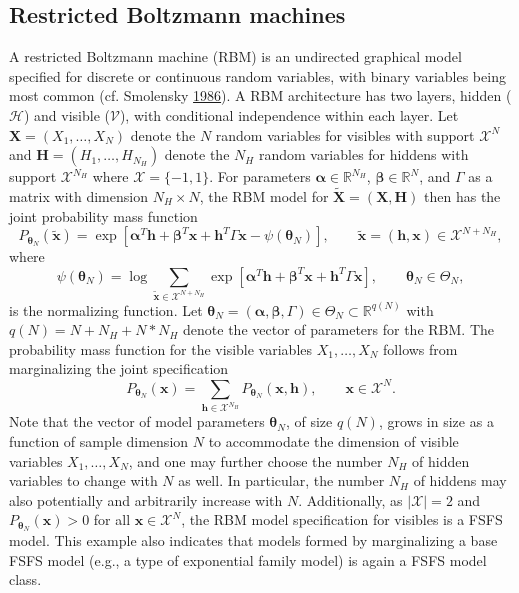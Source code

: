 \documentclass[12pt]{article}
\theoremstyle{definition}
\begin{document}
\subsection{Restricted Boltzmann
machines}\label{restricted-boltzmann-machines}

A restricted Boltzmann machine (RBM) is an undirected graphical model
specified for discrete or continuous random variables, with binary
variables being most common (cf. Smolensky
\protect\hyperlink{ref-smolensky1986information}{1986}). A RBM
architecture has two layers, hidden (\(\mathcal{H}\)) and visible
(\(\mathcal{V}\)), with conditional independence within each layer. Let
\(\boldsymbol X=(X_1,\ldots,X_N)\) denote the \(N\) random variables for
visibles with support \(\mathcal{X}^N\) and
\(\boldsymbol H=(H_1,\ldots,H_{N_H})\) denote the \(N_H\) random
variables for hiddens with support \(\mathcal{X}^{N_H}\) where
\(\mathcal{X} = \{-1,1\}\). For parameters
\(\boldsymbol \alpha \in \mathbb{R}^{N_H}\),
\(\boldsymbol \beta \in \mathbb{R}^N\), and \(\Gamma\) as a matrix with
dimension \(N_H \times N\), the RBM model for
\(\tilde{\boldsymbol X}=(\boldsymbol X,\boldsymbol H)\) then has the
joint probability mass function \[
P_{\boldsymbol \theta_N} (\tilde{\boldsymbol x}) = \exp\left[ \boldsymbol \alpha^T \boldsymbol h + \boldsymbol \beta^T \boldsymbol x + \boldsymbol h^T \Gamma \boldsymbol x - \psi(\boldsymbol \theta_N)\right], \qquad \tilde{\boldsymbol x} = (\boldsymbol h, \boldsymbol x) \in \mathcal{X}^{N+N_H},
\] where \[
\psi(\boldsymbol \theta_N) = \log \sum_{\tilde{\boldsymbol x} \in \mathcal{X}^{N + N_H}} \exp\left[ \boldsymbol \alpha^T \boldsymbol h + \boldsymbol \beta^T \boldsymbol x + \boldsymbol h^T \Gamma \boldsymbol x\right], \qquad \boldsymbol \theta_N \in \Theta_N,
\] is the normalizing function. Let
\(\boldsymbol \theta_N = (\boldsymbol \alpha, \boldsymbol \beta,\Gamma) \in \Theta_N \subset \mathbb{R}^{q(N)}\)
with \(q(N) = N + N_H + N*N_H\) denote the vector of parameters for the
RBM. The probability mass function for the visible variables
\(X_1, \dots, X_N\) follows from marginalizing the joint specification
\[
P_{\boldsymbol \theta_N} (\boldsymbol x) = \sum\limits_{\boldsymbol h \in \mathcal{X}^{N_H}} P_{\boldsymbol \theta_N} (\boldsymbol x, \boldsymbol h), \qquad \boldsymbol x \in \mathcal{X}^N.
\] Note that the vector of model parameters \(\boldsymbol \theta_N\), of
size \(q(N)\), grows in size as a function of sample dimension \(N\) to
accommodate the dimension of visible variables \(X_1, \dots, X_N\), and
one may further choose the number \(N_H\) of hidden variables to change
with \(N\) as well. In particular, the number \(N_H\) of hiddens may
also potentially and arbitrarily increase with \(N\). Additionally, as
\(|\mathcal{X}| = 2\) and
\(P_{\boldsymbol \theta_N}(\boldsymbol x) > 0\) for all
\(\boldsymbol x \in \mathcal{X}^N\), the RBM model specification for
visibles is a FSFS model. This example also indicates that models formed
by marginalizing a base FSFS model (e.g., a type of exponential family
model) is again a FSFS model class.
\end{document}
